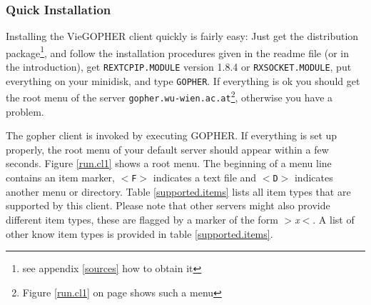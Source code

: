 \subsubsection{Quick Installation}

Installing the VieGOPHER client quickly is fairly easy:  Just get the
distribution package\footnote{see appendix \ref{sources} how to obtain it},
and follow the installation procedures given in the readme file (or
in the introduction),
get {\tt REXTCPIP.MODULE} version 1.8.4 or {\tt RXSOCKET.MODULE},
put everything on your minidisk, and type {\tt GOPHER}.
If everything is ok you should get the root menu of the server
{\tt gopher.wu-wien.ac.at}\footnote{Figure \ref{run.cl1} on page
\pageref{run.cl1} shows such a menu}, otherwise you have a problem.




The gopher client is invoked by executing GOPHER.  If everything is set up
properly, the root menu of your default server should appear within a
few seconds.  Figure \ref{run.cl1} shows a root menu.  The beginning of
a menu line contains an item marker, {\tt $<$F$>$} indicates a text file
and {\tt $<$D$>$} indicates another menu or directory.
Table \ref{supported.items} lists all item types that are supported
by this client.  Please note that other servers might also provide
different item types, these are flagged by a marker of the form
{\tt $>$}{\sl{x}}{\tt{$<$}}.  A list of other know item types is provided
in table \ref{supported.items}.



